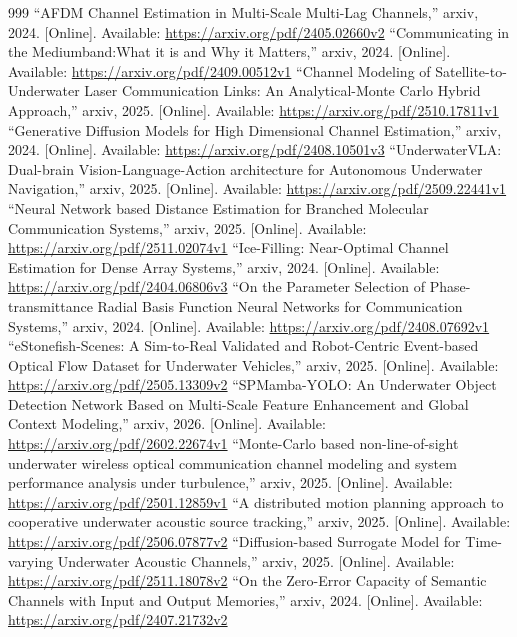 \documentclass[10pt,journal]{IEEEtran}
\begin{document}
\begin{thebibliography}{999}
 ``AFDM Channel Estimation in Multi-Scale Multi-Lag Channels,'' arxiv, 2024. [Online]. Available: \url{https://arxiv.org/pdf/2405.02660v2}
 ``Communicating in the Mediumband:What it is and Why it Matters,'' arxiv, 2024. [Online]. Available: \url{https://arxiv.org/pdf/2409.00512v1}
 ``Channel Modeling of Satellite-to-Underwater Laser Communication Links: An Analytical-Monte Carlo Hybrid Approach,'' arxiv, 2025. [Online]. Available: \url{https://arxiv.org/pdf/2510.17811v1}
 ``Generative Diffusion Models for High Dimensional Channel Estimation,'' arxiv, 2024. [Online]. Available: \url{https://arxiv.org/pdf/2408.10501v3}
 ``UnderwaterVLA: Dual-brain Vision-Language-Action architecture for Autonomous Underwater Navigation,'' arxiv, 2025. [Online]. Available: \url{https://arxiv.org/pdf/2509.22441v1}
 ``Neural Network based Distance Estimation for Branched Molecular Communication Systems,'' arxiv, 2025. [Online]. Available: \url{https://arxiv.org/pdf/2511.02074v1}
 ``Ice-Filling: Near-Optimal Channel Estimation for Dense Array Systems,'' arxiv, 2024. [Online]. Available: \url{https://arxiv.org/pdf/2404.06806v3}
 ``On the Parameter Selection of Phase-transmittance Radial Basis Function Neural Networks for Communication Systems,'' arxiv, 2024. [Online]. Available: \url{https://arxiv.org/pdf/2408.07692v1}
 ``eStonefish-Scenes: A Sim-to-Real Validated and Robot-Centric Event-based Optical Flow Dataset for Underwater Vehicles,'' arxiv, 2025. [Online]. Available: \url{https://arxiv.org/pdf/2505.13309v2}
 ``SPMamba-YOLO: An Underwater Object Detection Network Based on Multi-Scale Feature Enhancement and Global Context Modeling,'' arxiv, 2026. [Online]. Available: \url{https://arxiv.org/pdf/2602.22674v1}
 ``Monte-Carlo based non-line-of-sight underwater wireless optical communication channel modeling and system performance analysis under turbulence,'' arxiv, 2025. [Online]. Available: \url{https://arxiv.org/pdf/2501.12859v1}
 ``A distributed motion planning approach to cooperative underwater acoustic source tracking,'' arxiv, 2025. [Online]. Available: \url{https://arxiv.org/pdf/2506.07877v2}
 ``Diffusion-based Surrogate Model for Time-varying Underwater Acoustic Channels,'' arxiv, 2025. [Online]. Available: \url{https://arxiv.org/pdf/2511.18078v2}
 ``On the Zero-Error Capacity of Semantic Channels with Input and Output Memories,'' arxiv, 2024. [Online]. Available: \url{https://arxiv.org/pdf/2407.21732v2}

\end{thebibliography}
\end{document}
